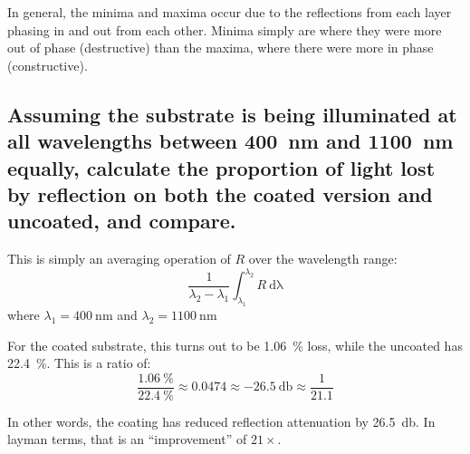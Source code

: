 \documentclass[a4paper]{scrartcl}
\begin{document}
In general, the minima and maxima occur due to the reflections from each layer phasing in and out from each other. Minima simply are where they were more out of phase (destructive) than the maxima, where there were more in phase (constructive).

\subsection{Assuming the substrate is being illuminated at all wavelengths between \SI{400}{\nano\metre} and \SI{1100}{\nano\metre} equally, calculate the proportion of light lost by reflection on both the coated version and uncoated, and compare.}
This is simply an averaging operation of \(R\) over the wavelength range:
\[\frac{1}{\lambda_2 - \lambda_1} \int_{\lambda_1}^{\lambda_2} R \:\mathrm{d \lambda}\]
where \(\lambda_1 = \SI{400}{\nano\metre}\) and \(\lambda_2 = \SI{1100}{\nano\metre}\)

For the coated substrate, this turns out to be \SI{1.06}{\percent} loss, while the uncoated has \SI{22.4}{\percent}. This is a ratio of:
\[\frac{\SI{1.06}{\percent}}{\SI{22.4}{\percent}} \approx 0.0474 \approx \SI{-26.5}{\decibel} \approx \frac{1}{21.1}\]

In other words, the coating has reduced reflection attenuation by \SI{26.5}{\decibel}. In layman terms, that is an ``improvement'' of \(21\times\).
\end{document}
